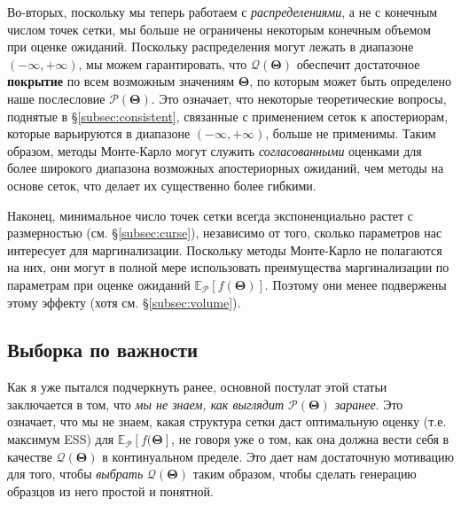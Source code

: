 \documentclass[12pt, titlepage]{article}
\newcommand{\meanwrt}[2]{\ensuremath{\mathbb{E}_{{#2}}\left[{#1}\right]}}
\newcommand{\params}{\ensuremath{\boldsymbol\Theta}}
\newcommand{\posterior}{\ensuremath{\mathcal{P}}}
\newcommand{\proposal}{\ensuremath{\mathcal{Q}}}
\begin{document}
Во-вторых, поскольку мы теперь работаем с \textit{распределениями}, а не с конечным числом точек сетки, мы больше не ограничены некоторым конечным объемом при оценке ожиданий. Поскольку распределения могут лежать в диапазоне $(-\infty, +\infty)$, мы можем гарантировать, что $\proposal(\params)$ обеспечит достаточное \textbf{покрытие} по всем возможным значениям $\params$, по которым может быть определено наше послесловие $\posterior(\params)$. Это означает, что некоторые теоретические вопросы, поднятые в \S\ref{subsec:consistent}, связанные с применением сеток к апостериорам, которые варьируются в диапазоне $(-\infty, +\infty)$, больше не применимы. Таким образом, методы Монте-Карло могут служить \textit{согласованными} оценками для более широкого диапазона возможных апостериорных ожиданий, чем методы на основе сеток, что делает их существенно более гибкими.

Наконец, минимальное число точек сетки всегда экспоненциально растет с размерностью (см. \S\ref{subsec:curse}), независимо от того, сколько параметров нас интересует для маргинализации. Поскольку методы Монте-Карло не полагаются на них, они могут в полной мере использовать преимущества маргинализации по параметрам при оценке ожиданий $\meanwrt{f(\params)}{\posterior}$. Поэтому они менее подвержены этому эффекту (хотя см. \S\ref{subsec:volume}).

\subsection{Выборка по важности} \label{subsec:importance}

Как я уже пытался подчеркнуть ранее, основной постулат этой статьи заключается в том, что \textit{мы не знаем, как выглядит $\posterior(\params)$ заранее}. Это означает, что мы не знаем, какая структура сетки даст оптимальную оценку (т.е. максимум ESS) для $\meanwrt{f(\params}{\posterior}$, не говоря уже о том, как она должна вести себя в качестве $\proposal(\params)$ в континуальном пределе. Это дает нам достаточную мотивацию для того, чтобы \textit{выбрать} $\proposal(\params)$ таким образом, чтобы сделать генерацию образцов из него простой и понятной.
\end{document}
